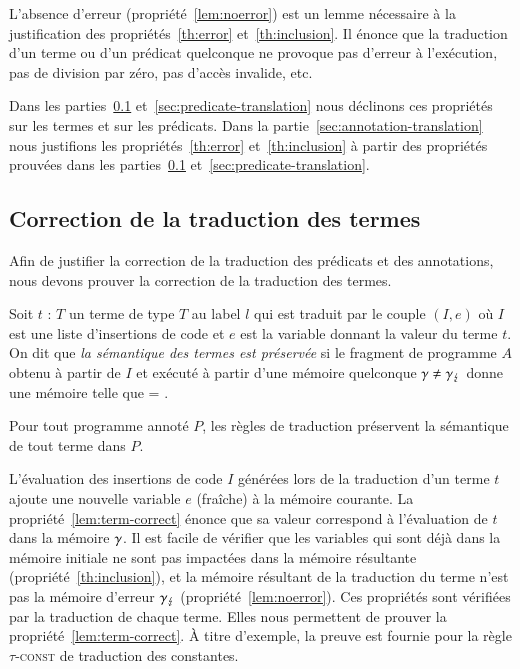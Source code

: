L'absence d'erreur (propriété~\ref{lem:noerror}) est un lemme nécessaire à la
justification des propriétés~\ref{th:error} et~\ref{th:inclusion}.
Il énonce que la traduction d'un terme ou d'un prédicat \eacsl quelconque ne
provoque pas d'erreur à l'exécution, pas de division par zéro, pas d'accès
invalide, etc.

Dans les parties~\ref{sec:term-translation} et~\ref{sec:predicate-translation}
nous déclinons ces propriétés sur les termes et sur les prédicats.
Dans la partie~\ref{sec:annotation-translation} nous justifions les
propriétés~\ref{th:error} et~\ref{th:inclusion} à partir des propriétés prouvées
dans les parties~\ref{sec:term-translation} et~\ref{sec:predicate-translation}.


\subsection{Correction de la traduction des termes}
\label{sec:term-translation}


Afin de justifier la correction de la traduction des prédicats et des
annotations, nous devons prouver la correction de la traduction des termes.

\begin{definition}
  \label{def:term-correct}
  Soit $t$ : $T$ un terme de type $T$ au label $l$ qui est traduit par le couple
  $(I, e)$ où $I$ est une liste d'insertions de code et $e$ est la variable
  donnant la valeur du terme $t$.
  On dit que \emph{la sémantique des termes est préservée} si le fragment de
  programme $A$ obtenu à partir de $I$ et exécuté à partir d'une mémoire
  quelconque $\gamma \neq \gamma_\lightning$ donne une mémoire  telle
  que  = .
\end{definition}

\begin{myproperty}
  \label{lem:term-correct}
  Pour tout programme annoté $P$, les règles de traduction préservent la
  sémantique de tout terme \eacsl dans $P$.
\end{myproperty}

L'évaluation des insertions de code $I$ générées lors de la traduction d'un
terme $t$ ajoute une nouvelle variable $e$ (fraîche) à la mémoire courante.
La propriété~\ref{lem:term-correct} énonce que sa valeur correspond à
l'évaluation de $t$ dans la mémoire $\gamma$.
Il est facile de vérifier que les variables qui sont déjà dans la mémoire
initiale ne sont pas impactées dans la mémoire résultante
(propriété~\ref{th:inclusion}), et la mémoire résultant de la traduction du
terme n'est pas la mémoire d'erreur $\gamma_\lightning$ (propriété~\ref{lem:noerror}).
Ces propriétés sont vérifiées par la traduction de chaque terme.
Elles nous permettent de prouver la propriété~\ref{lem:term-correct}.
À titre d'exemple, la preuve est fournie pour la règle \textsc{$\tau$-const} de
traduction des constantes.


